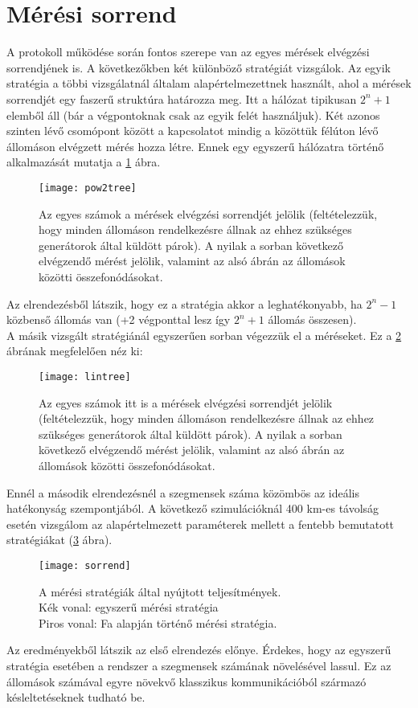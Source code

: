 \section{Mérési sorrend}

A protokoll működése során fontos szerepe van az egyes mérések elvégzési sorrendjének is. A következőkben két különböző stratégiát vizsgálok. Az egyik stratégia a többi vizsgálatnál általam alapértelmezettnek használt, ahol a mérések sorrendjét egy faszerű struktúra határozza meg. Itt a hálózat tipikusan $2^n+1$ elemből áll (bár a végpontoknak csak az egyik felét használjuk). Két azonos szinten lévő csomópont között a kapcsolatot mindig a közöttük félúton lévő állomáson elvégzett mérés hozza létre. Ennek egy egyszerű hálózatra történő alkalmazását mutatja a \ref{fig:sorrend1} ábra.
\begin{figure}[H]
\centering
\texttt{[image: pow2tree]}
\caption[Fa alapján történő mérési stratégia]{Az egyes számok a mérések elvégzési sorrendjét jelölik (feltételezzük, hogy minden állomáson rendelkezésre állnak az ehhez szükséges generátorok által küldött párok). A nyilak a sorban következő elvégzendő mérést jelölik, valamint az alsó ábrán az állomások közötti összefonódásokat.}
\label{fig:sorrend1}
\end{figure}
Az elrendezésből látszik, hogy ez a stratégia akkor a leghatékonyabb, ha $2^n-1$ közbenső állomás van (+2 végponttal lesz így $2^n+1$ állomás összesen).\\
A másik vizsgált stratégiánál egyszerűen sorban végezzük el a méréseket. Ez a \ref{fig:sorrend2} ábrának megfelelően néz ki:
\begin{figure}[H]
\centering
\texttt{[image: lintree]}
\caption[Egyszerű mérési stratégia]{Az egyes számok itt is a mérések elvégzési sorrendjét jelölik (feltételezzük, hogy minden állomáson rendelkezésre állnak az ehhez szükséges generátorok által küldött párok). A nyilak a sorban következő elvégzendő mérést jelölik, valamint az alsó ábrán az állomások közötti összefonódásokat.}
\label{fig:sorrend2}
\end{figure}
Ennél a második elrendezésnél a szegmensek száma közömbös az ideális hatékonyság szempontjából. A következő szimulációknál 400 km-es távolság esetén vizsgálom az alapértelmezett paraméterek mellett a fentebb bemutatott stratégiákat (\ref{fig:sorrend3} ábra).
\begin{figure}[H]
\centering
\texttt{[image: sorrend]}
\caption[Mérési stratégiák]{A mérési stratégiák által nyújtott teljesítmények.\\
Kék vonal: egyszerű mérési stratégia\\
Piros vonal: Fa alapján történő mérési stratégia.
}
\label{fig:sorrend3}
\end{figure}
Az eredményekből látszik az első elrendezés előnye. Érdekes, hogy az egyszerű stratégia esetében a rendszer a szegmensek számának növelésével lassul. Ez az állomások számával egyre növekvő klasszikus kommunikációból származó késleltetéseknek tudható be.


